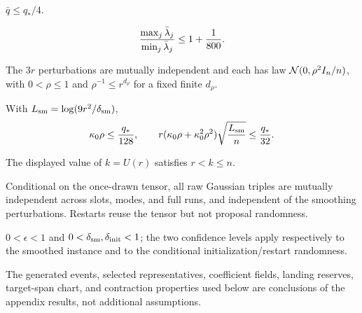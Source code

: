 \begin{assumption}\label{assump:cumulative-gram}
$\bar q\le q_*/4$.
\end{assumption}

\begin{assumption}\label{assump:base-weight-balance}
\[
 {\max_j\bar\lambda_j\over\min_j\bar\lambda_j}\le1+{1\over800}.
\]
\end{assumption}

\begin{assumption}\label{assump:gaussian-smoothing}
The $3r$ perturbations are mutually independent and each has law
${\cal N}(0,\rho^2I_n/n)$, with $0<\rho\le1$ and
$\rho^{-1}\le r^{d_\rho}$ for a fixed finite $d_\rho$.
\end{assumption}

\begin{assumption}\label{assump:smoothing-margin}
With $L_{\rm sm}=\log(9r^2/\delta_{\rm sm})$,
\[
 \kappa _0\rho\le {q_*\over128},\qquad
 r(\kappa _0\rho+\kappa _0^2\rho^2)
 \sqrt{\frac{L_{\rm sm}}n}\le {q_*\over32}.
\]
\end{assumption}

\begin{assumption}\label{assump:subquadratic-rank}
The displayed value of $k=U(r)$ satisfies $r<k\le n$.
\end{assumption}

\begin{assumption}\label{assump:random-initialization}
Conditional on the once-drawn tensor, all raw Gaussian triples are mutually
independent across slots, modes, and full runs, and independent of the
smoothing perturbations. Restarts reuse the tensor but not proposal
randomness.
\end{assumption}

\begin{assumption}\label{assump:accuracy-confidence}
$0<\epsilon<1$ and $0<\delta_{\rm sm},\delta_{\rm init}<1$; the two
confidence levels apply respectively to the smoothed instance and to the
conditional initialization/restart randomness.
\end{assumption}

The generated events, selected representatives, coefficient fields, landing
reserves, target-span chart, and contraction properties used below are
conclusions of the appendix results, not additional assumptions.
